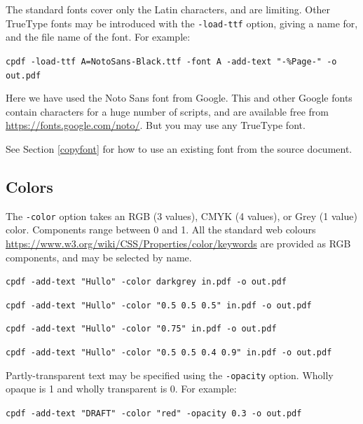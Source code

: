 \documentclass{book}
\begin{document}
The standard fonts cover only the Latin characters, and are limiting. Other TrueType fonts may be introduced with the \texttt{-load-ttf} option, giving a name for, and the file name of the font. For example:

  \begin{framed}
    \noindent\small\verb!cpdf -load-ttf A=NotoSans-Black.ttf -font A -add-text "-%Page-" -o out.pdf!
  \end{framed}

\noindent Here we have used the Noto Sans font from Google. This and other Google fonts contain characters for a huge number of scripts, and are available free from \url{https://fonts.google.com/noto/}. But you may use any TrueType font.

See Section \ref{copyfont} for how to use an existing font from the source document.

  \subsection{Colors}
  The \texttt{-color} option takes an RGB (3 values), CMYK (4 values), or Grey (1 value) color. Components range between 0 and 1. All the standard web colours \url{https://www.w3.org/wiki/CSS/Properties/color/keywords} are provided as RGB components, and may be selected by name.

  \begin{framed}
    \noindent\small\verb!cpdf -add-text "Hullo" -color darkgrey in.pdf -o out.pdf!
    
    \vspace{1.5mm}
    \noindent\small\verb!cpdf -add-text "Hullo" -color "0.5 0.5 0.5" in.pdf -o out.pdf!

    \vspace{1.5mm}
    \noindent\small\verb!cpdf -add-text "Hullo" -color "0.75" in.pdf -o out.pdf!

    \vspace{1.5mm}
    \noindent\small\verb!cpdf -add-text "Hullo" -color "0.5 0.5 0.4 0.9" in.pdf -o out.pdf!
  \end{framed}

\noindent Partly-transparent text may be specified using the \verb!-opacity! option. Wholly opaque is 1 and wholly transparent is 0. For example:

\begin{framed}
  \noindent\small\verb!cpdf -add-text "DRAFT" -color "red" -opacity 0.3 -o out.pdf!
\end{framed}
\end{document}
